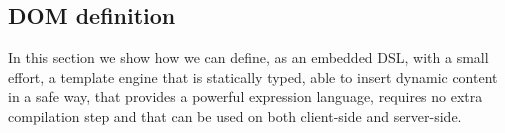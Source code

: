 \documentclass[american,english,runningheads]{llncs}
\begin{document}
% 
% 
% 
% 


\subsection{DOM definition}

In this section we show how we can define, as an embedded DSL, with a small effort, a template engine that is statically typed, able to insert dynamic content in a safe way, that provides a powerful expression language, requires no extra compilation step and that can be used on both client-side and server-side.
\end{document}
